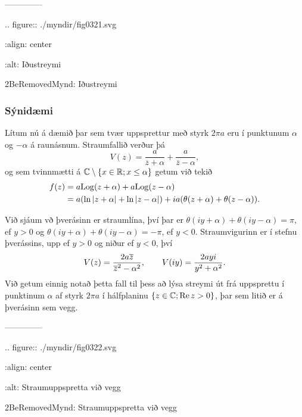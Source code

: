 --------------





.. figure:: ./myndir/fig0321.svg

    :align: center

    :alt: Iðustreymi

    2BeRemovedMynd: Iðustreymi



\subsubsection{Sýnidæmi}  Lítum nú á dæmið þar sem tvær uppsprettur með styrk $2\pi a$ eru
í punktunum $\alpha$ og $-\alpha$ á raunásnum.  Straumfallið verður
þá
 $$V(z)= \dfrac a{\overline z+\alpha}+\dfrac a{\overline z-\alpha},
 $$
og sem tvinnmætti á ${\mathbb C}\setminus\{x\in {\mathbb R}; x\leq \alpha\}$ getum
við tekið 
\begin{align*}
f(z)&= a{\operatorname{Log}}(z+\alpha)+a{\operatorname{Log}}(z-\alpha) \\
&=
a(\ln|z+\alpha|+\ln|z-\alpha|)+ia(\theta(z+\alpha)+\theta(z-\alpha)).
\end{align*}

Við sjáum vð þverásinn er straumlína, því þar er
$\theta(iy+\alpha)+\theta(iy-\alpha)={\pi}$, ef $y>0$ og
$\theta(iy+\alpha)+\theta(iy-\alpha)=-{\pi}$, ef $y<0$.
Straumvigurinn er í stefnu þverássins, upp ef $y>0$ og niður
ef $y<0$, því
 $$V(z)=\dfrac{2a\overline z}{\overline z\sp 2-\alpha\sp 2},\qquad
V(iy)=\dfrac{2ayi}{y\sp 2+\alpha\sp 2}.
 $$
Við getum einnig notað þetta fall til þess að lýsa streymi út frá
uppsprettu í punktinum $\alpha$ af styrk $2\pi a$ í hálfplaninu
$\{z\in {\mathbb C}; {\operatorname{Re\, }} z>0\}$, þar sem litið er á þverásinn sem vegg.


--------------




.. figure:: ./myndir/fig0322.svg

    :align: center

    :alt: Straumuppspretta við vegg

    2BeRemovedMynd: Straumuppspretta við vegg



